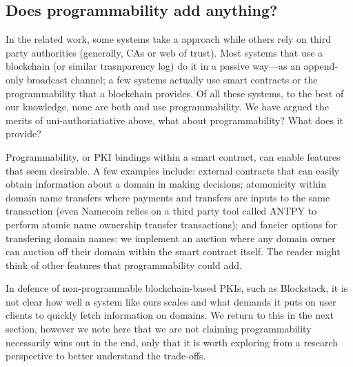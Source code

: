 %





\subsection{Does programmability add anything?}
\label{sec:program}

In the related work, some systems take a \UA approach while others rely on third party authorities (generally, CAs or web of trust). Most systems that use a blockchain (or similar trasnparency log) do it in a passive way---as an append-only broadcast channel; a few systems actually use smart contracts or the programmability that a blockchain provides. Of all these systems, to the best of our knowledge, none are both \UA and use programmability. We have argued the merits of uni-authoriatiative above, what about programmability? What does it provide?

Programmability, or PKI bindings within a smart contract, can enable features that seem desirable. A few examples include: external contracts that can easily obtain information about a domain in making decisions; atomonicity within domain name transfers where payments and transfers are inputs to the same transaction (\eg even Namecoin relies on a third party tool called ANTPY to perform atomic name ownership transfer transactions); and fancier options for transfering domain names: we implement an auction where any domain owner can auction off their domain within the smart contract itself. The reader might think of other features that programmability could add.

In defence of non-programmable blockchain-based PKIs, such as Blockstack, it is not clear how well a system like ours scales and what demands it puts on user clients to quickly fetch information on domains. We return to this in the next section, however we note here that we are not claiming programmability necessarily wins out in the end, only that it is worth exploring from a research perspective to better understand the trade-offs. 

